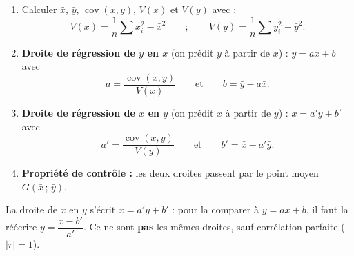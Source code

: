 \documentclass[11pt]{article}
\begin{document}
\begin{methode}
\begin{enumerate}
\item Calculer $\bar{x}$, $\bar{y}$, $\operatorname{cov}(x,y)$, $V(x)$ et $V(y)$ avec :
\[ V(x)=\frac{1}{n}\sum x_i^2-\bar{x}^2 \qquad ; \qquad V(y)=\frac{1}{n}\sum y_i^2-\bar{y}^2. \]
\item \textbf{Droite de régression de $y$ en $x$} (on prédit $y$ à partir de $x$) : $y=ax+b$ avec
\[ a=\frac{\operatorname{cov}(x,y)}{V(x)} \qquad \text{et} \qquad b=\bar{y}-a\bar{x}. \]
\item \textbf{Droite de régression de $x$ en $y$} (on prédit $x$ à partir de $y$) : $x=a'y+b'$ avec
\[ a'=\frac{\operatorname{cov}(x,y)}{V(y)} \qquad \text{et} \qquad b'=\bar{x}-a'\bar{y}. \]
\item \textbf{Propriété de contrôle :} les deux droites passent par le point moyen $G(\bar{x}\,;\,\bar{y})$.
\end{enumerate}
\begin{attention}
La droite de $x$ en $y$ s'écrit $x=a'y+b'$ : pour la comparer à $y=ax+b$, il faut la réécrire $y=\dfrac{x-b'}{a'}$. Ce ne sont \textbf{pas} les mêmes droites, sauf corrélation parfaite ($|r|=1$).
\end{attention}
\end{methode}
\end{document}
